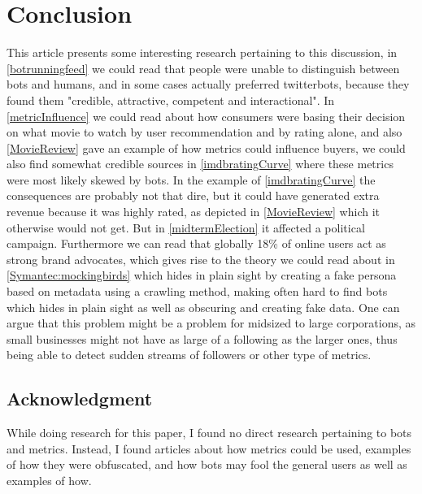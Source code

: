 \section{Conclusion}
This article presents some interesting research pertaining to this discussion, in \ref{botrunningfeed} we could read that people were unable to distinguish between bots and humans, and in some cases actually preferred twitterbots, because they found them "credible, attractive, competent and interactional"\cite{Edwards2014372}. In \ref{metricInfluence} we could read about how consumers were basing their decision on what movie to watch by user recommendation and by rating alone, and also \ref{MovieReview} gave an example of how metrics could influence buyers, we could also find somewhat credible sources in \ref{imdbratingCurve} where these metrics were most likely skewed by bots. In the example of \ref{imdbratingCurve} the consequences are probably not that dire, but it could have generated extra revenue because it was highly rated, as depicted in \ref{MovieReview} which it otherwise would not get. But in \ref{midtermElection} it affected a political campaign. Furthermore we can read that globally 18\% of online users act as strong brand advocates, which gives rise to the theory we could read about in \ref{Symantec:mockingbirds} which hides in plain sight by creating a fake persona based on  metadata using a crawling method, making often hard to find bots which hides in plain sight as well as obscuring and creating fake data. One can argue that this problem might be a problem for midsized to large corporations, as small businesses might not have as large of a following as the larger ones, thus being able to detect sudden streams of followers or other type of metrics.





\subsection{Acknowledgment}
While doing research for this paper, I found no direct research pertaining to bots and metrics. Instead, I found articles about how metrics could be used, examples of how they were obfuscated, and how bots may fool the general users as well as examples of how.